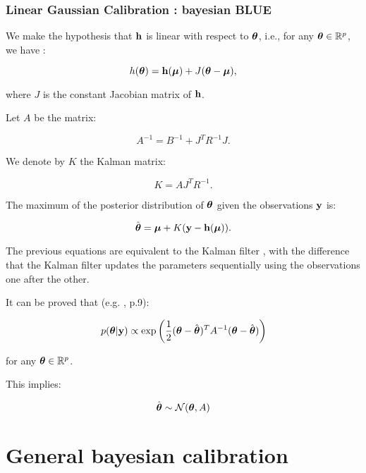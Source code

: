 \documentclass{beamer}
\begin{document}
\begin{frame}
\frametitle{Linear Gaussian Calibration : bayesian BLUE}
We make the hypothesis that ${\bf h}$ is linear with respect to
$\boldsymbol{\theta}$, i.e., for any
$\boldsymbol{\theta}\in\mathbb{R}^p$, we have :

$$
h(\boldsymbol{\theta}) = {\bf h}(\boldsymbol{\mu}) + J(\boldsymbol{\theta}-\boldsymbol{\mu} ),
$$

where $J$ is the constant Jacobian matrix of ${\bf h}$.

Let $A$ be the matrix:

$$
A^{-1} = B^{-1} + J^T R^{-1} J.
$$

We denote by $K$ the Kalman matrix:

$$
K = A J^T R^{-1}.
$$

The maximum of the posterior distribution of $\boldsymbol{\theta}$ given
the observations ${\bf y}$ is:

$$
\hat{\boldsymbol{\theta}} = \boldsymbol{\mu} + K ({\bf y} - {\bf h}(\boldsymbol{\mu})).
$$

\end{frame}

\begin{frame}

The previous equations are equivalent to the Kalman filter \cite{Asch2016}, 
with the difference that the Kalman filter updates the parameters 
sequentially using the observations one after the other.

It can be proved that (e.g. \cite{RasmussenWilliams}, p.9):

$$
   p(\boldsymbol{\theta} | {\bf y}) \propto 
   \exp\left(\frac{1}{2} (\boldsymbol{\theta} - \hat{\boldsymbol{\theta}})^T A^{-1} (\boldsymbol{\theta} - \hat{\boldsymbol{\theta}}) \right)
$$

for any $\boldsymbol{\theta}\in\mathbb{R}^p$.

This implies:

$$
\hat{\boldsymbol{\theta}} \sim \mathcal{N}(\boldsymbol{\theta},A)
$$
\end{frame}

\section{General bayesian calibration}

\end{document}
